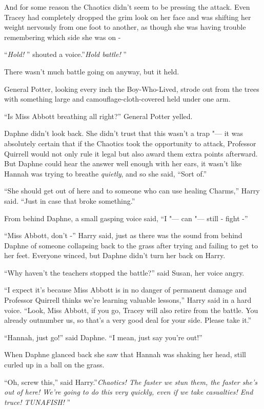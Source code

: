 And for some reason the Chaotics didn't seem to be pressing the attack.
Even Tracey had completely dropped the grim look on her face and was
shifting her weight nervously from one foot to another, as though she
was having trouble remembering which side she was on -

``\emph{Hold!} '' shouted a voice.''\emph{Hold battle!} ''

There wasn't much battle going on anyway, but it held.

General Potter, looking every inch the Boy-Who-Lived, strode out from
the trees with something large and camouflage-cloth-covered held under
one arm.

``Is Miss Abbott breathing all right?'' General Potter yelled.

Daphne didn't look back. She didn't trust that this wasn't a trap "--- it
was absolutely certain that if the Chaotics took the opportunity to
attack, Professor Quirrell would not only rule it legal but also award
them extra points afterward. But Daphne could hear the answer well
enough with her ears, it wasn't like Hannah was trying to breathe
\emph{quietly}, and so she said, ``Sort of.''

``She should get out of here and to someone who can use healing
Charms,'' Harry said. ``Just in case that broke something.''

From behind Daphne, a small gasping voice said, ``I "--- can "--- still -
fight -''

``Miss Abbott, don't -'' Harry said, just as there was the sound from
behind Daphne of someone collapsing back to the grass after trying and
failing to get to her feet. Everyone winced, but Daphne didn't turn her
back on Harry.

``Why haven't the teachers stopped the battle?'' said Susan, her voice
angry.

``I expect it's because Miss Abbott is in no danger of permanent damage
and Professor Quirrell thinks we're learning valuable lessons,'' Harry
said in a hard voice. ``Look, Miss Abbott, if you go, Tracey will also
retire from the battle. You already outnumber us, so that's a very good
deal for your side. Please take it.''

``Hannah, just go!'' said Daphne. ``I mean, just say you're out!''

When Daphne glanced back she saw that Hannah was shaking her head, still
curled up in a ball on the grass.

``Oh, screw this,'' said Harry.''\emph{Chaotics! The faster we stun
them, the faster she's out of here! We're going to do this very quickly,
even if we take casualties! End truce! TUNAFISH!} ''

